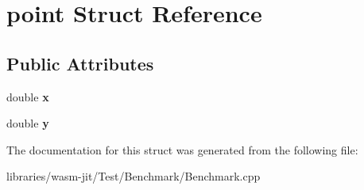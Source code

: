 \hypertarget{structpoint}{}\section{point Struct Reference}
\label{structpoint}
\subsection*{Public Attributes}
\begin{DoxyCompactItemize}
\item 
\mbox{\label{structpoint_a9c6b34deaf4900ad4193c17935fd384a}} 
double {\bfseries x}
\item 
\mbox{\label{structpoint_a613f8f0d7352731638b0094e1b958b87}} 
double {\bfseries y}
\end{DoxyCompactItemize}


The documentation for this struct was generated from the following file\+:\begin{DoxyCompactItemize}
\item 
libraries/wasm-\/jit/\+Test/\+Benchmark/Benchmark.\+cpp\end{DoxyCompactItemize}
